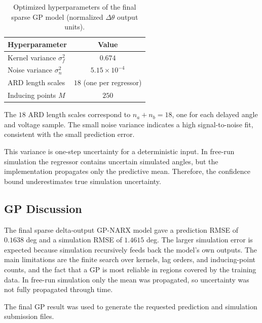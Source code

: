 \begin{table}[htbp]
\caption{Optimized hyperparameters of the final sparse GP model
(normalized \(\Delta\theta\) output units).}
\centering
\begin{tabular}{lc}
\toprule
Hyperparameter & Value \\
\midrule
Kernel variance \(\sigma_f^2\)   & \(0.674\) \\
Noise variance \(\sigma_n^2\)    & \(5.15\times 10^{-4}\) \\
ARD length scales                & \(18\) (one per regressor) \\
Inducing points \(M\)            & \(250\) \\
\bottomrule
\end{tabular}
\label{tab:gp_hyperparameters}
\end{table}

The \(18\) ARD length scales correspond to \(n_a+n_b=18\), one for each
delayed angle and voltage sample. The small noise variance indicates a
high signal-to-noise fit, consistent with the small prediction error.

This variance is one-step uncertainty for a deterministic input. In
free-run simulation the regressor contains uncertain simulated angles,
but the implementation propagates only the predictive mean. Therefore,
the confidence bound underestimates true simulation uncertainty.


\subsection{GP Discussion}

The final sparse delta-output GP-NARX model gave a prediction RMSE of
\(0.1638\) deg and a simulation RMSE of \(1.4615\) deg. The larger
simulation error is expected because simulation recursively feeds back
the model's own outputs. The main limitations are the finite search over
kernels, lag orders, and inducing-point counts, and the fact that a GP is
most reliable in regions covered by the training data. In free-run
simulation only the mean was propagated, so uncertainty was not fully
propagated through time.

The final GP result was used to generate the requested prediction and
simulation submission files.
